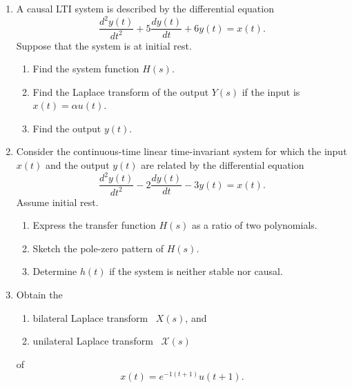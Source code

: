 \documentclass[11pt]{article}
\newcommand\lt{Laplace transform}
\begin{document}
\begin{enumerate}
        \item A causal LTI system is described by the differential equation
        \begin{equation*}
            \frac{d^2y(t)}{dt^2} + 5\frac{dy(t)}{dt} + 6y(t) = x(t).
        \end{equation*}
        Suppose that the system is at initial rest.
        \begin{enumerate}
            \item Find the system function $H(s)$.
            \item Find the Laplace transform of the output $Y(s)$ if the input is $x(t) = \alpha u(t)$.
            \item Find the output $y(t)$.
        \end{enumerate}  



        \item Consider the continuous-time linear time-invariant system for which the input $x(t)$ and the output $y(t)$ are related by the differential equation
            \begin{equation*}
                \frac{d^2 y(t)}{d t^2} - 2\frac{d y(t)}{d t} -3y(t) = x(t).
            \end{equation*}
            Assume initial rest.
            \begin{enumerate}
                \item Express the transfer function $H(s)$ as a ratio of two polynomials. 
                \item Sketch the pole-zero pattern of $H(s)$.
                \item Determine $h(t)$ if the system is neither stable nor causal. 
            \end{enumerate}

           \item Obtain the
           \begin{enumerate}
           		\item bilateral \lt~ $X(s)$, and 
           		\item unilateral  \lt~ $\mathcal{X}(s)$
           \end{enumerate}
           of
           \begin{equation*}
           		x(t) = e^{-1(t+1)}u(t+1).
           \end{equation*}
           

\end{enumerate}
\end{document}
